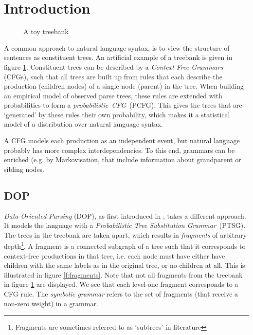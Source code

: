 
\section{Introduction}




\begin{figure}[h!]
\center 
\caption{A toy treebank} \label{f:treebank}
\end{figure}

A common approach to natural language syntax, is to view the structure of sentences as constituent trees. An artificial example of a treebank is given in figure \ref{f:treebank}. Constituent trees can be described by a \emph{Context Free Grammars} (CFGs),  such that all trees are built up from  rules that each describe the production (children nodes) of a single node (parent) in the tree. When building an empirical model of observed parse trees, these rules are extended with probabilities to form a \emph{probabilistic~CFG}~(PCFG). This gives the trees that are `generated' by these rules their own probability, which makes it a statistical model of a distribution over natural language syntax.

A CFG models each production as an independent event, but natural language probably has more complex interdependencies. To this end, grammars can be enriched (e.g. by Markovisation, that include information about grandparent or sibling nodes.


\subsection{DOP}
\emph{Data-Oriented Parsing} (DOP), as first introduced in \cite{scha1990}, takes a different approach. It models the language with a \emph{Probabilistic Tree Substitution Grammar}~(PTSG). 
The trees in the treebank are taken apart, which results in \emph{fragments} of arbitrary depth\footnote{Fragments are sometimes referred to as `subtrees' in literature}.
A fragment is a connected subgraph of a tree such that it corresponds to context-free productions in that tree, i.e. each node must have either have children with the same labels as in the original tree, or no children at all. This is illustrated in figure \ref{f:fragments}. Note that not all fragments from the treebank in figure \ref{f:treebank} are displayed. We see that each level-one fragment corresponds to a CFG rule. The \emph{symbolic grammar} refers to the set of fragments (that receive a non-zero weight) in a grammar. 



